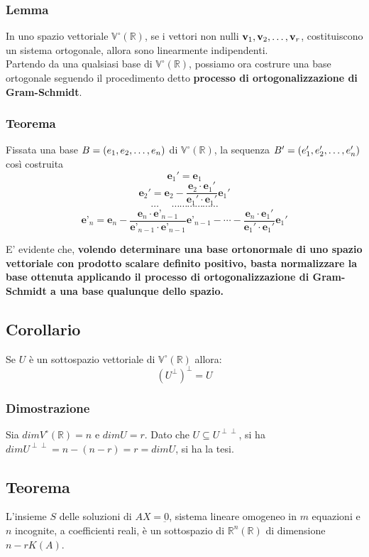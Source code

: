 \documentclass[../main.tex]{subfiles}
\begin{document}
\subsubsection{Lemma}
In uno spazio vettoriale $\mathbb{V}^{\circ}(\mathbb{R})$, se i vettori non
nulli $\textbf{v}_1, \textbf{v}_2, \ldots, \textbf{v}_{r}$, costituiscono un sistema ortogonale, allora sono
linearmente indipendenti.\\ Partendo da una qualsiasi base di
$\mathbb{V}^{\circ}(\mathbb{R})$, possiamo ora costrure una base ortogonale
seguendo il procedimento detto \textbf{processo di ortogonalizzazione di
    Gram-Schmidt}.\\

\subsubsection{Teorema}
Fissata una base $B = (e_1, e_2, \ldots, e_{n})$ di $\mathbb{V}^{\circ}(\mathbb{R})$, la
sequenza $B' = (e'_1, e'_2, \ldots, e'_{n})$ così costruita
\[
    \textbf{e}_1' = \textbf{e}_1
\]
\[
    \textbf{e}_2' = \textbf{e}_2 - \dfrac{\textbf{e}_2\cdot\textbf{e}_1'}{\textbf{e}_1'\cdot\textbf{e}_1'}\textbf{e}_1'
\]
\[
    \cdots \ \ \ \ \ \ \cdots\cdots\cdots\cdots\cdots\cdots
\]
\[
    \textbf{e'}_n = \textbf{e}_n - \dfrac{\textbf{e}_n\cdot\textbf{e'}_{n-1}}{\textbf{e'}_{n-1}\cdot\textbf{e'}_{n-1}}\textbf{e'}_{n-1} - \cdots - \dfrac{\textbf{e}_n\cdot\textbf{e}_1'}{\textbf{e}_1'\cdot\textbf{e}_1'}\textbf{e}_1'
\]

E' evidente che, \textbf{volendo determinare una base ortonormale di uno spazio
    vettoriale con prodotto scalare definito positivo, basta normalizzare la base
    ottenuta applicando il processo di ortogonalizzazione di Gram-Schmidt a una
    base qualunque dello spazio.}

\subsection{Corollario}
Se $U$ è un sottospazio vettoriale di $\mathbb{V}^{\circ}(\mathbb{R})$ allora:
\[
    (U^{\perp})^{\perp} = U\]

\subsubsection{Dimostrazione}
Sia $dim V^{\circ} (\mathbb{R}) = n$ e $dim U = r$. Dato che $U\subseteq
    U^{\perp\perp}$, si ha $dim U^{\perp\perp} = n-(n-r) = r = dim U$, si ha la tesi.

\subsection{Teorema}
L'insieme $S$ delle soluzioni di $AX = \underbar{0}$, sistema lineare omogeneo in $m$ equazioni e $n$ incognite, a coefficienti reali, è un sottospazio di $\mathbb{R}^n (\mathbb{R})$ di dimensione $n-rK (A)$.
\end{document}
